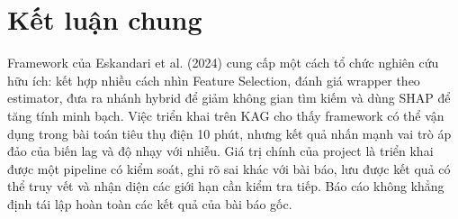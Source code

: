 \section{Kết luận chung}\label{kux1ebft-luux1eadn-chung}

Framework của Eskandari et al. (2024) cung cấp một cách tổ chức nghiên cứu hữu ích: kết hợp nhiều cách nhìn Feature Selection, đánh giá wrapper theo estimator, đưa ra nhánh hybrid để giảm không gian tìm kiếm và dùng SHAP để tăng tính minh bạch. Việc triển khai trên KAG cho thấy framework có thể vận dụng trong bài toán tiêu thụ điện 10 phút, nhưng kết quả nhấn mạnh vai trò áp đảo của biến lag và độ nhạy với nhiễu. Giá trị chính của project là triển khai được một pipeline có kiểm soát, ghi rõ sai khác với bài báo, lưu được kết quả có thể truy vết và nhận diện các giới hạn cần kiểm tra tiếp. Báo cáo không khẳng định tái lập hoàn toàn các kết quả của bài báo gốc.
